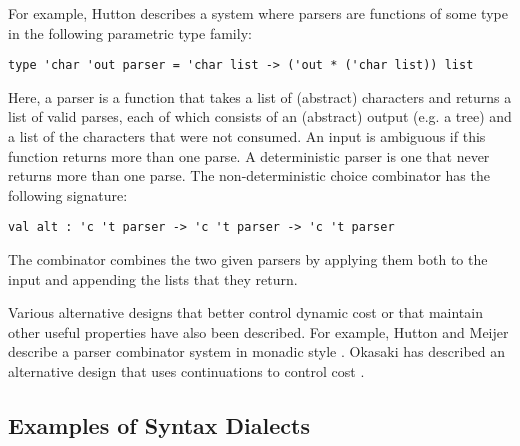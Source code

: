 For example, Hutton describes a system where parsers are functions of some type in the following parametric type family:%
\begin{lstlisting}[numbers=none]
type 'char 'out parser = 'char list -> ('out * ('char list)) list
\end{lstlisting}
Here, a parser is a function that takes a list of (abstract) characters and returns a list of valid parses, each of which consists of an (abstract) output (e.g. a tree) and a list of the characters that were not consumed. An input is ambiguous if this function returns more than one parse. A deterministic parser is one that never returns more than one parse. The  non-deterministic choice combinator  has the following signature: 
\begin{lstlisting}[numbers=none]
val alt : 'c 't parser -> 'c 't parser -> 'c 't parser
\end{lstlisting}
The  combinator combines the two given parsers by applying them both to the input and appending the lists that they return.

Various alternative designs that better control dynamic cost or that maintain other useful properties have also been described. For example, Hutton and Meijer describe a parser combinator system in monadic style \cite{hutton1998monadic}. Okasaki has described an alternative design that uses continuations to control cost \cite{Okasaki98b}.



\subsection{Examples of Syntax Dialects}\label{sec:examples-of-syntax-dialects}
